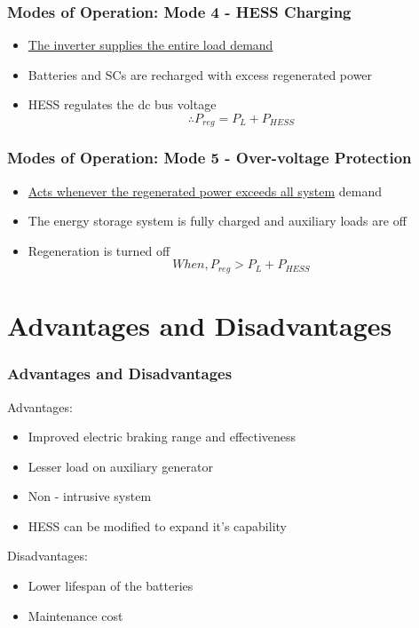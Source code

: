 \documentclass[aspectratio=169]{beamer}
\begin{document}
\begin{frame}
	\frametitle{Modes of Operation: Mode 4 - HESS Charging}
	\label{frame:mode4}
	\begin{itemize}
		\item \hyperlink{frame:modes}{The inverter supplies the entire load demand}
		\item  Batteries and SCs are recharged with excess
		regenerated power
		\item HESS regulates the dc bus voltage 
	\begin{equation}  {\therefore P_{reg} = P_{L} + P_{HESS}} \end{equation}
	\end{itemize}
	
\end{frame}

\begin{frame}
	\frametitle{Modes of Operation: Mode 5 - Over-voltage Protection}
	\label{frame:mode5}
	\begin{itemize}
		\item  \hyperlink{frame:modes}{Acts whenever the regenerated power exceeds all system}
		demand
		\item The energy storage system is fully charged and auxiliary loads
		are off
		\item Regeneration is turned off
		\begin{equation}  {When, P_{reg} > P_{L} + P_{HESS}} \end{equation}
	\end{itemize}
	
\end{frame}


\section{Advantages and Disadvantages}
\begin{frame}
	\frametitle{Advantages and Disadvantages}
Advantages:
	\begin{itemize}
		\item  Improved electric braking range and effectiveness
		\item  Lesser load on auxiliary generator
		\item  Non - intrusive system
		\item  HESS can be modified to expand it's capability
	\end{itemize}

Disadvantages:
	\begin{itemize}
		\item Lower lifespan of the batteries 
		\item  Maintenance cost

	\end{itemize}	
	


\end{frame}
\end{document}
